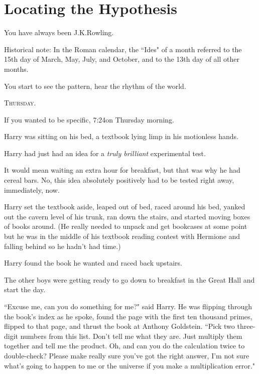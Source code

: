 \chapter{Locating the Hypothesis}

\begin{chapterOpeningAuthorNote}
You have always been J.\?K.\?Rowling.

Historical note: In the Roman calendar, the ``Ides" of a month referred to the 15th day of March, May, July, and October, and to the 13th day of all other months.
\end{chapterOpeningAuthorNote}
\begin{chapterOpeningQuote}
You start to see the pattern, hear the rhythm of the world.
\end{chapterOpeningQuote}

\lettrine{T}{hursday.}

\hplettrineextrapara
If you wanted to be specific, 7:24\am on Thursday morning.

Harry was sitting on his bed, a textbook lying limp in his motionless hands.

Harry had just had an idea for a \emph{truly brilliant} experimental test.

It would mean waiting an extra hour for breakfast, but that was why he had cereal bars. No, this idea absolutely positively had to be tested right away, immediately, now.

Harry set the textbook aside, leaped out of bed, raced around his bed, yanked out the cavern level of his trunk, ran down the stairs, and started moving boxes of books around. (He really needed to unpack and get bookcases at some point but he was in the middle of his textbook reading contest with Hermione and falling behind so he hadn't had time.)

Harry found the book he wanted and raced back upstairs.

The other boys were getting ready to go down to breakfast in the Great Hall and start the day.

``Excuse me, can you do something for me?" said Harry. He was flipping through the book's index as he spoke, found the page with the first ten thousand primes, flipped to that page, and thrust the book at Anthony Goldstein. ``Pick two three-digit numbers from this list. Don't tell me what they are. Just multiply them together and tell me the product. Oh, and can you do the calculation twice to double-check? Please make really sure you've got the right answer, I'm not sure what's going to happen to me or the universe if you make a multiplication error."

